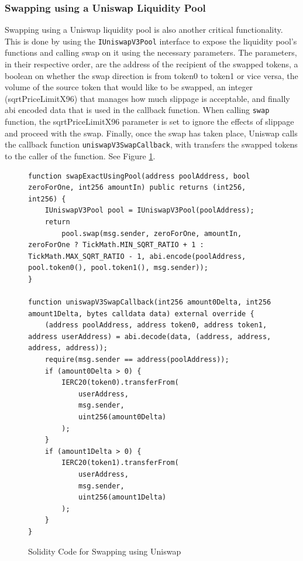 \subsubsection{Swapping using a Uniswap Liquidity Pool}
Swapping using a Uniswap liquidity pool is also another critical functionality. This is done by using the \texttt{IUniswapV3Pool} interface to expose the liquidity pool's functions and calling swap on it using the necessary parameters. The parameters, in their respective order, are the address of the recipient of the swapped tokens, a boolean on whether the swap direction is from token0 to token1 or vice versa, the volume of the source token that would like to be swapped, an integer (sqrtPriceLimitX96) that manages how much slippage is acceptable, and finally abi encoded data that is used in the callback function. When calling \texttt{swap} function, the sqrtPriceLimitX96 parameter is set to ignore the effects of slippage and proceed with the swap. Finally, once the swap has taken place, Uniswap calls the callback function \texttt{uniswapV3SwapCallback}, with transfers the swapped tokens to the caller of the function. See Figure \ref{fig:sol-code-swap}.

\begin{figure}[htb!]
\begin{adjustwidth}{-0.5in}{-0.5in}
\begin{minipage}{\linewidth}
\centering
\begin{lstlisting}[language=Solidity]
function swapExactUsingPool(address poolAddress, bool zeroForOne, int256 amountIn) public returns (int256, int256) {
    IUniswapV3Pool pool = IUniswapV3Pool(poolAddress);
    return
        pool.swap(msg.sender, zeroForOne, amountIn, zeroForOne ? TickMath.MIN_SQRT_RATIO + 1 : TickMath.MAX_SQRT_RATIO - 1, abi.encode(poolAddress, pool.token0(), pool.token1(), msg.sender));
}

function uniswapV3SwapCallback(int256 amount0Delta, int256 amount1Delta, bytes calldata data) external override {
    (address poolAddress, address token0, address token1, address userAddress) = abi.decode(data, (address, address, address, address));
    require(msg.sender == address(poolAddress));
    if (amount0Delta > 0) {
        IERC20(token0).transferFrom(
            userAddress,
            msg.sender,
            uint256(amount0Delta)
        );
    }
    if (amount1Delta > 0) {
        IERC20(token1).transferFrom(
            userAddress,
            msg.sender,
            uint256(amount1Delta)
        );
    }
}
\end{lstlisting}
\end{minipage}
\end{adjustwidth}
\caption{Solidity Code for Swapping using Uniswap \label{fig:sol-code-swap}}
\end{figure}

